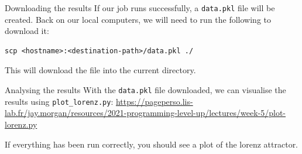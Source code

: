 \documentclass[10pt]{beamer}
\begin{document}
\begin{frame}[label={sec:org39ebc19},fragile]{Downloading the results}
 If our job runs successfully, a \texttt{data.pkl} file will be created. Back on our local
computers, we will need to run the following to download it:

\begin{verbatim}
scp <hostname>:<destination-path>/data.pkl ./
\end{verbatim}

This will download the file into the current directory.
\end{frame}

\begin{frame}[label={sec:orge23bcba},fragile]{Analysing the results}
 With the \texttt{data.pkl} file downloaded, we can visualise the results using
\texttt{plot\_lorenz.py}:
\url{https://pageperso.lis-lab.fr/jay.morgan/resources/2021-programming-level-up/lectures/week-5/plot-lorenz.py}

If everything has been run correctly, you should see a plot of the lorenz attractor.
\end{frame}
\end{document}
